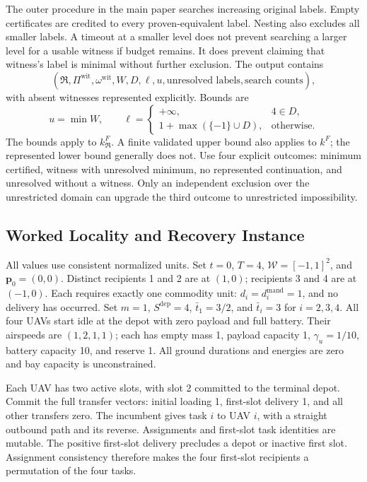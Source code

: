 The outer procedure in the main paper searches increasing original labels.
Empty certificates are credited to every proven-equivalent label. Nesting
also excludes all smaller labels. A timeout at a smaller level does not
prevent searching a larger level for a usable witness if budget remains.
It does prevent claiming that witness's label is minimal without further
exclusion. The output contains
\begin{equation}
(\mathfrak R,\Pi^{\mathrm{wit}},\omega^{\mathrm{wit}},W,D,\ell,u,
\text{unresolved labels},\text{search counts}),
\label{eq:recovery_record}
\end{equation}
with absent witnesses represented explicitly. Bounds are
\begin{equation}
u=\min W,\qquad
\ell=\begin{cases}
+\infty,&4\in D,\\
1+\max(\{-1\}\cup D),&\text{otherwise}.
\end{cases}
\label{eq:supp_search_bounds}
\end{equation}
The bounds apply to $k_{\mathfrak R}^F$. A finite validated upper bound also
applies to $k^F$; the represented lower bound generally does not.
Use four explicit outcomes: minimum certified, witness with unresolved
minimum, no represented continuation, and unresolved without a witness.
Only an independent exclusion over the unrestricted domain can upgrade
the third outcome to unrestricted impossibility.

\balance
\subsection{Worked Locality and Recovery Instance}
\label{subsec:worked_recovery_instance}

All values use consistent normalized units. Set $t=0$, $T=4$,
$\mathcal W=[-1,1]^2$, and $\mathbf p_0=(0,0)$. Distinct recipients
1 and 2 are at $(1,0)$; recipients 3 and 4 are at $(-1,0)$.
Each requires exactly one commodity unit: $d_i=d_i^{\mathrm{mand}}=1$,
and no delivery has occurred. Set $m=1$, $S^{\mathrm{dep}}=4$,
$\bar t_1=3/2$, and $\bar t_i=3$ for $i=2,3,4$.
All four UAVs start idle at the depot with zero payload and full battery.
Their airspeeds are $(1,2,1,1)$; each has empty mass 1, payload capacity 1,
$\gamma_u=1/10$, battery capacity 10, and reserve 1.
All ground durations and energies are zero and bay capacity is unconstrained.

Each UAV has two active slots, with slot 2 committed to the terminal depot.
Commit the full transfer vectors: initial loading 1, first-slot delivery 1,
and all other transfers zero. The incumbent gives task $i$ to UAV $i$,
with a straight outbound path and its reverse. Assignments and first-slot
task identities are mutable. The positive first-slot delivery precludes
a depot or inactive first slot. Assignment consistency therefore makes the
four first-slot recipients a permutation of the four tasks.

